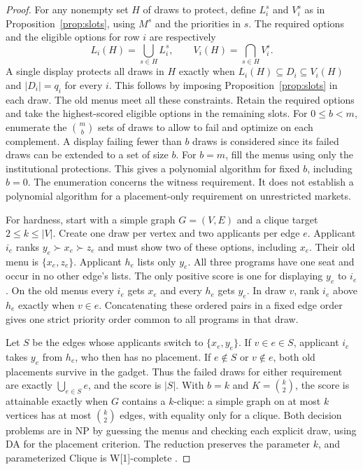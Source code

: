 \begin{proof}
For any nonempty set $H$ of draws to protect, define $L_i^s$ and $V_i^s$ as in Proposition~\ref{prop:slots}, using $M^s$ and the priorities in $s$.
The required options and the eligible options for row $i$ are respectively
\[
 L_i(H)=\bigcup_{s\in H}L_i^s,\qquad
 V_i(H)=\bigcap_{s\in H}V_i^s .
\]
A single display protects all draws in $H$ exactly when
$L_i(H)\subseteq D_i\subseteq V_i(H)$ and $|D_i|=q_i$ for every $i$.
This follows by imposing Proposition~\ref{prop:slots} in each draw.
The old menus meet all these constraints. Retain the required options and take the highest-scored eligible options in the remaining slots. For $0\le b<m$, enumerate the $\binom{m}{b}$ sets of draws to allow to fail and optimize on each complement.
A display failing fewer than $b$ draws is considered since its failed draws can be extended to a set of size $b$.
For $b=m$, fill the menus using only the institutional protections.
This gives a polynomial algorithm for fixed $b$, including $b=0$.
The enumeration concerns the witness requirement. It does not establish a polynomial algorithm for a placement-only requirement on unrestricted markets.

For hardness, start with a simple graph $G=(V,E)$ and a clique target $2\le k\le |V|$. Create one draw per vertex and two applicants per edge $e$. Applicant $i_e$ ranks $y_e\succ x_e\succ z_e$ and must show two of these options, including $x_e$. Their old menu is $\{x_e,z_e\}$. Applicant $h_e$ lists only $y_e$. All three programs have one seat and occur in no other edge's lists. The only positive score is one for displaying $y_e$ to $i_e$. On the old menus every $i_e$ gets $x_e$ and every $h_e$ gets $y_e$. In draw $v$, rank $i_e$ above $h_e$ exactly when $v\in e$. Concatenating these ordered pairs in a fixed edge order gives one strict priority order common to all programs in that draw.

Let $S$ be the edges whose applicants switch to $\{x_e,y_e\}$. If $v\in e\in S$, applicant $i_e$ takes $y_e$ from $h_e$, who then has no placement. If $e\notin S$ or $v\notin e$, both old placements survive in the gadget. Thus the failed draws for either requirement are exactly $\bigcup_{e\in S} e$, and the score is $|S|$. With $b=k$ and $K=\binom{k}{2}$, the score is attainable exactly when $G$ contains a $k$-clique: a simple graph on at most $k$ vertices has at most $\binom{k}{2}$ edges, with equality only for a clique. Both decision problems are in NP by guessing the menus and checking each explicit draw, using DA for the placement criterion. The reduction preserves the parameter $k$, and parameterized Clique is W[1]-complete \citep[Corollary~3.2]{downeyClique}.
\end{proof}


